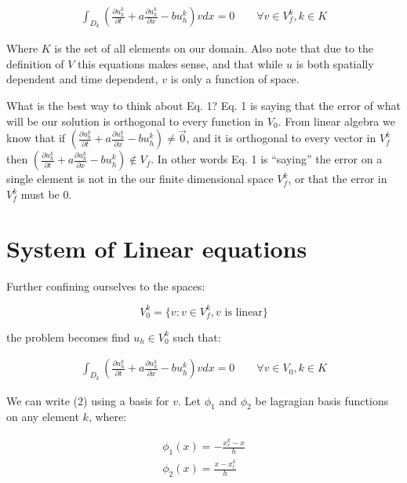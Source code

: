 \documentclass{article}
\begin{document}
\begin{gather}
  \int_{D_k} \left(\frac{\partial u_h^k}{\partial t} + a \frac{\partial u_h^k}{\partial x} - bu^k_h\right) v dx = 0 \qquad \forall v \in V_f^k,  k \in K
\end{gather}

\noindent Where $K$ is the set of all elements on our domain. Also note that due to the definition of $V$ this equations makes sense, and that while $u$ is both spatially dependent and time dependent, $v$ is only a function of space.

\vspace{3mm}

\noindent What is the best way to think about Eq. 1? Eq. 1 is saying that the error of what will be our solution is orthogonal to every function in $V_0$. From linear algebra we know that if $\left(\frac{\partial u_h^k}{\partial t} + a \frac{\partial u_h^k}{\partial x} - bu_h^k\right) \neq \vec{0}$, and it is orthogonal to every vector in $V_f^k$ then $\left(\frac{\partial u_h^k}{\partial t} + a \frac{\partial u_h^k}{\partial x} - bu_h^k\right) \notin V_f$. In other words Eq. 1 is ``saying'' the error on a single element is not in the our finite dimensional space $V_f^k$, or that the error in $V_f^k$ must be 0.

\section{System of Linear equations}

\noindent Further confining ourselves to the spaces:

$$ V_0^k = \{ v : v \in V_f^k, v \text{ is linear}\}$$

\noindent the problem becomes find $u_h \in V_0^k$ such that:

\begin{gather}
  \int_{D_k} \left(\frac{\partial u_h^k}{\partial t} + a \frac{\partial u_h^k}{\partial x} - bu_h^k\right) v dx = 0 \qquad \forall v \in V_0,  k \in K
\end{gather}

\noindent We can write (2) using a basis for $v$. Let $\phi_1$ and $\phi_2$ be lagragian basis functions on any element $k$, where:

\begin{gather*}
  \phi_1(x) = - \frac{x_r^k - x}{h}\\
  \phi_2(x) = \frac{x - x_l^k}{h}\\
\end{gather*}
\end{document}
